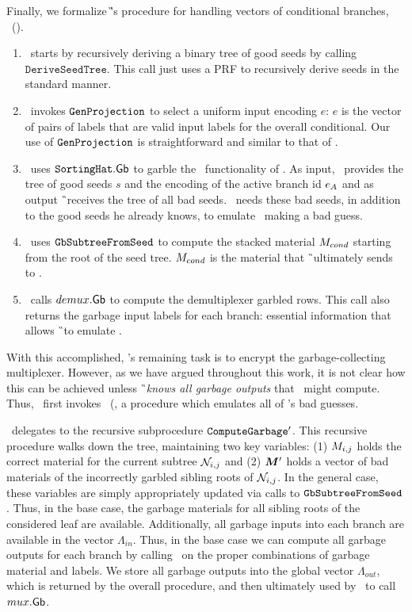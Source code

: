 Finally, we formalize \G's procedure for handling vectors of
conditional branches, \gbcond~().
%
\begin{enumerate}
  \item \gbcond\ starts by recursively deriving a binary tree of
good seeds by calling $\mathtt{DeriveSeedTree}$. This call just uses a PRF
to recursively derive seeds in the standard manner.
%
\item \gbcond\ invokes $\mathtt{GenProjection}$ to select a uniform input
encoding $e$: $e$ is the vector of pairs of labels that are
valid input labels for the overall conditional.
Our use of $\mathtt{GenProjection}$ is straightforward and similar to that of
\HK.
%
\item \gbcond\ uses $\mathtt{SortingHat}.\textsf{Gb}$ to garble the \gadget\
  functionality of .
  As input, \gbcond\ provides the tree of good seeds $s$ and the encoding
  of the active branch id $e_{A}$ and as output \G\ receives the tree
  of all bad seeds.
  \gbcond\ needs these bad seeds, in addition to the good seeds he
  already knows, to emulate \E\ making a bad guess.
%
\item \gbcond\ uses $\mathtt{GbSubtreeFromSeed}$ to compute the stacked material
$M_{cond}$ starting from the root of the seed tree.
$M_{cond}$ is the material that \G\ ultimately sends to \E.
%
\item \gbcond\ calls $demux.\textsf{Gb}$ to compute the demultiplexer garbled
  rows.  This call also returns the garbage input labels for each
  branch: essential information that allows \G\ to emulate \E.
\end{enumerate}
With this accomplished, \gbcond's remaining task is to encrypt the
garbage-collecting multiplexer.
However, as we have argued throughout this work, it is not clear how
this can be achieved unless \G\ \emph{knows all garbage outputs} that
\E\ might compute.
%
Thus, \gbcond\ first invokes \computegarbage\
(, a procedure which
emulates all of \E's bad guesses.

\computegarbage\ delegates to the recursive subprocedure
$\mathtt{ComputeGarbage}'$. This recursive procedure walks down the tree,
maintaining two key variables: (1) $M_{i,j}$ holds the correct
material for the current subtree $\mathtt{\cal N}_{i,j}$ and (2) $\vec{\mat}'$
holds a vector of bad materials of the incorrectly garbled sibling
roots of $\mathtt{\cal N}_{i,j}$.
%
In the general case, these variables are simply appropriately updated
via calls to $\mathtt{GbSubtreeFromSeed}$.
Thus,
in the base case, the garbage materials for all sibling roots of the
considered leaf are available.
Additionally, all garbage inputs into each branch are available in the
vector $\Lambda_{in}$.
%
Thus, in the base case we can compute all garbage outputs for each
branch by calling \gEv\ on the proper combinations of garbage material
and labels.
%
We store all garbage outputs into the global vector $\Lambda_{out}$, which is
returned by the overall procedure, and then ultimately used by
\gbcond\ to call $mux.\textsf{Gb}$.
